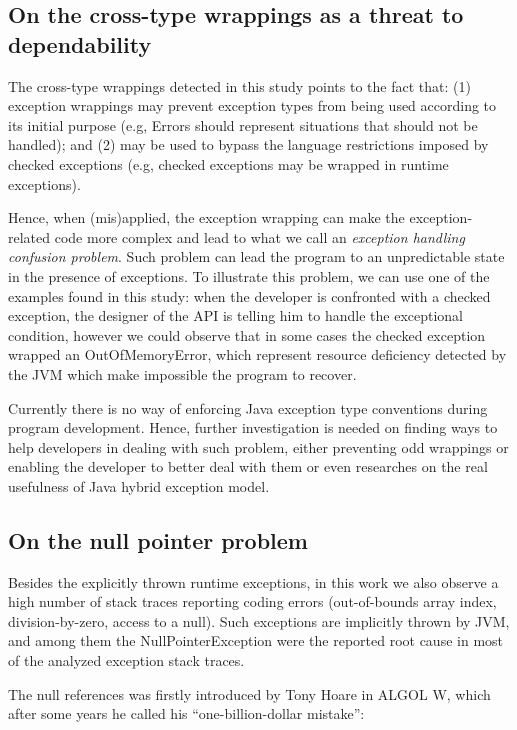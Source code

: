 \documentclass[conference]{IEEEtran}
\begin{document}
\subsection{On the cross-type wrappings as a threat to dependability}
The cross-type wrappings detected in this study points to the fact that: (1) exception 
wrappings may prevent exception types from being used according to its initial purpose
 (e.g, Errors should represent situations that should not be handled); and (2) may  be used
 to bypass the language restrictions imposed by checked exceptions  (e.g,
 checked exceptions may be wrapped in runtime exceptions).

Hence, when (mis)applied, the exception wrapping can make the exception-related code
 more complex and lead to what we call an \emph{exception handling confusion problem}.
Such problem can lead the program to
an unpredictable state in the presence of exceptions. To illustrate this problem, we can use
 one of the examples found in this study: when the developer is 
confronted with a checked exception, the designer of the API is telling him 
to handle the exceptional condition, however we could observe that in some cases the 
checked exception wrapped an OutOfMemoryError, which represent resource deficiency detected 
by the JVM which make impossible the program to recover. 

Currently there is no way of enforcing Java exception type conventions during program development.
Hence, further investigation is needed on finding ways to help developers in dealing with such
 problem, either preventing odd wrappings or enabling the developer to better deal with them or even
researches on the real usefulness of Java hybrid exception model. 


\subsection{On the null pointer problem}

Besides the explicitly thrown runtime exceptions, in this work we also observe a high number of 
stack traces reporting coding errors (out-of-bounds array index, division-by-zero, access to a null).
Such exceptions are implicitly thrown by JVM, and among them the NullPointerException 
were the reported root cause in most of the analyzed exception stack traces.

The null references was firstly introduced by Tony Hoare in ALGOL W, which after some years he called his “one-billion-dollar mistake”:
\end{document}
